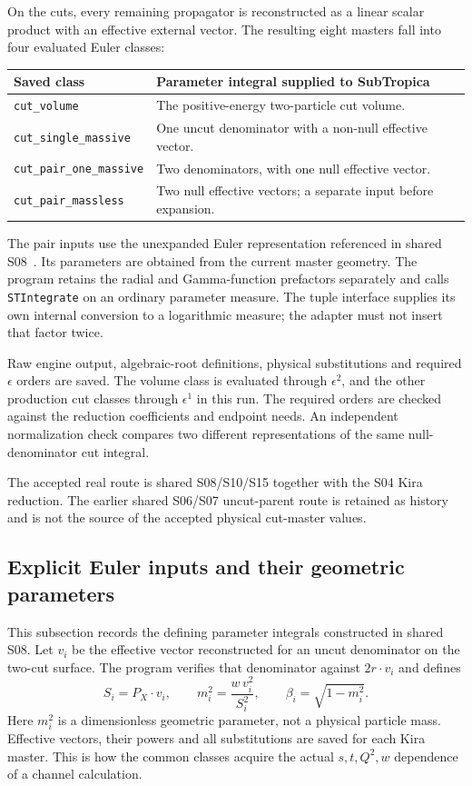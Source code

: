 \documentclass[11pt,a4paper]{article}
\newcommand{\eps}{\epsilon}
\begin{document}
On the cuts, every remaining propagator is reconstructed as a linear
scalar product with an effective external vector. The resulting eight
masters fall into four evaluated Euler classes:
\begin{center}
\begin{tabularx}{\textwidth}{@{}l X@{}}
\toprule
Saved class & Parameter integral supplied to SubTropica\\
\midrule
\texttt{cut\_volume} & The positive-energy two-particle cut volume.\\
\texttt{cut\_single\_massive} & One uncut denominator with a non-null effective vector.\\
\texttt{cut\_pair\_one\_massive} & Two denominators, with one null effective vector.\\
\texttt{cut\_pair\_massless} & Two null effective vectors; a separate input before expansion.\\
\bottomrule
\end{tabularx}
\end{center}
The pair inputs use the unexpanded Euler representation referenced in
shared S08~\cite{eulerreference}. Its parameters are obtained from the
current master geometry. The program retains the radial and Gamma-function
prefactors separately and calls \texttt{STIntegrate} on an ordinary
parameter measure. The tuple interface supplies its own internal conversion
to a logarithmic measure; the adapter must not insert that factor twice.

Raw engine output, algebraic-root definitions, physical substitutions and
required $\eps$ orders are saved. The volume class is evaluated through
$\eps^2$, and the other production cut classes through $\eps^1$ in this run.
The required orders are checked against the reduction coefficients and
endpoint needs. An independent normalization check compares two different
representations of the same null-denominator cut integral.

The accepted real route is shared S08/S10/S15 together with the S04 Kira
reduction. The earlier shared S06/S07 uncut-parent route is retained as
history and is not the source of the accepted physical cut-master values.

\subsection{Explicit Euler inputs and their geometric parameters}
\label{sec:euler}

This subsection records the defining parameter integrals constructed in
shared S08. Let $v_i$ be the effective vector reconstructed for an uncut
denominator on the two-cut surface. The program verifies that denominator
against $2r\cdot v_i$ and defines
\begin{equation}
 S_i=P_X\cdot v_i,\qquad
 m_i^2=\frac{w\,v_i^2}{S_i^2},\qquad
 \beta_i=\sqrt{1-m_i^2}.
 \label{eq:effectivevectors}
\end{equation}
Here $m_i^2$ is a dimensionless geometric parameter, not a physical
particle mass. Effective vectors, their powers and all substitutions are
saved for each Kira master. This is how the common classes acquire the
actual $s,t,Q^2,w$ dependence of a channel calculation.
\end{document}
